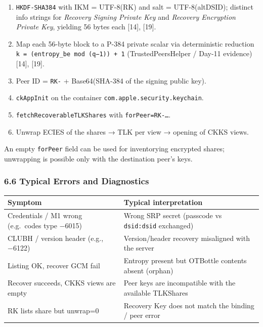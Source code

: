 \documentclass[
  english,
  10pt]{article}
\newcounter{none} %
\providecommand{\tightlist}{%
  \setlength{\itemsep}{0pt}\setlength{\parskip}{0pt}}
\begin{document}
\begin{enumerate}
\def\labelenumi{\arabic{enumi}.}
\tightlist
\item
  \texttt{HKDF-SHA384} with IKM = UTF-8(RK) and salt = UTF-8(altDSID);
  distinct info strings for \emph{Recovery Signing Private Key} and
  \emph{Recovery Encryption Private Key}, yielding 56 bytes each
  {[}14{]}, {[}19{]}.
\item
  Map each 56-byte block to a P-384 private scalar via deterministic
  reduction \texttt{k\ =\ (entropy\_be\ mod\ (q−1))\ +\ 1}
  (TrustedPeersHelper / Day-11 evidence) {[}14{]}, {[}19{]}.
\item
  Peer ID = \texttt{RK-} + Base64(SHA-384 of the signing public key).
\item
  \texttt{ckAppInit} on the container
  \texttt{com.apple.security.keychain}.
\item
  \texttt{fetchRecoverableTLKShares} with \texttt{forPeer=RK-…}.
\item
  Unwrap ECIES of the shares → TLK per view → opening of CKKS views.
\end{enumerate}

An empty \texttt{forPeer} field can be used for inventorying encrypted
shares; unwrapping is possible only with the destination peer's keys.

\subsubsection{6.6 Typical Errors and
Diagnostics}\label{typical-errors-and-diagnostics}

{\def\LTcaptype{none} %
\begin{longtable}[]{@{}
  >{\raggedright\arraybackslash}p{}
  >{\raggedright\arraybackslash}p{}@{}}
\toprule\noalign{}
\begin{minipage}[b]{\linewidth}\raggedright
Symptom
\end{minipage} & \begin{minipage}[b]{\linewidth}\raggedright
Typical interpretation
\end{minipage} \\
\midrule\noalign{}
\endhead
\bottomrule\noalign{}
\endlastfoot
Credentials / M1 wrong (e.g.~codes type −6015) & Wrong SRP secret
(passcode vs \texttt{dsid:dsid} exchanged) \\
CLUBH / version header (e.g., −6122) & Version/header recovery
misaligned with the server \\
Listing OK, recover GCM fail & Entropy present but OTBottle contents
absent (orphan) \\
Recover succeeds, CKKS views are empty & Peer keys are incompatible with
the available TLKShares \\
RK lists share but unwrap=0 & Recovery Key does not match the binding /
peer error \\
\end{longtable}
}
\end{document}
